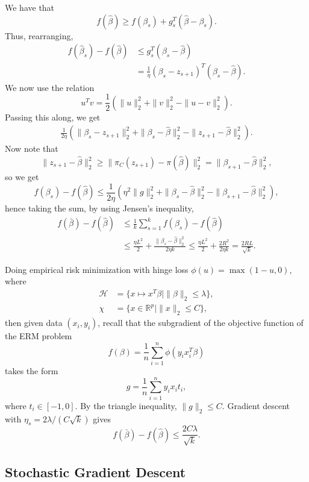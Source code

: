 \documentclass[12pt]{article}
\begin{document}
\begin{proofbox}
	We have that
	\[
	f(\hat \beta) \geq f(\beta_s) + g_s^T(\hat \beta - \beta_s).
	\]
	Thus, rearranging,
	\begin{align*}
		f(\hat \beta_s) - f(\hat \beta) &\leq g_s^T(\beta_s - \hat \beta) \\
						&= \frac{1}{\eta}(\beta_s - z_{s+1})^T(\beta_s - \hat \beta).
	\end{align*}
	We now use the relation
	\[
	u^Tv = \frac{1}{2} (\|u\|_2^2 + \|v\|_2^2 - \|u-v\|_2^2).
	\]
	Passing this along, we get
	\begin{align*}
		\frac{1}{2\eta}(\|\beta_s - z_{s+1}\|_2^2 + \|\beta_s - \hat \beta\|_2^2 - \|z_{s+1} - \hat \beta\|_2^2 ).
	\end{align*}
	Now note that
	\[
	\|z_{s+1} - \hat \beta\|_2^2 \geq \|\pi_C(z_{s+1}) - \pi(\hat \beta)\|_2^2 = \|\beta_{s+1} - \hat \beta\|_2^2,
	\]
	so we get
	\[
	f(\beta_s) - f(\hat \beta) \leq \frac{1}{2 \eta}(\eta^2 \|g\|_2^2 + \|\beta_s - \hat \beta\|_2^2 - \|\beta_{s+1} - \hat \beta\|_2^2),
	\]
	hence taking the sum, by using Jensen's inequality,
	\begin{align*}
		f(\bar \beta) - f(\hat \beta) &\leq \frac{1}{k} \sum_{s = 1}^k f(\beta_s) - f(\hat \beta) \\
					      &\leq \frac{\eta L^2}{2} + \frac{\|\beta_s - \hat \beta\|_2^2}{2 \eta k} \leq \frac{\eta L^2}{2} + \frac{2R^2}{2\eta k} = \frac{2RL}{\sqrt k}.
	\end{align*}
\end{proofbox}

\begin{exbox}
	Doing empirical risk minimization with hinge loss $\phi(u) = \max(1 - u, 0)$, where
	\begin{align*}
		\mathcal{H} &= \{ x \mapsto x^T \beta \mid \|\beta\|_2 \leq \lambda\}, \\
				\chi &= \{x \in \mathbb{R}^p \mid \|x\|_2 \leq C\},
	\end{align*}
	then given data $(x_i, y_i)$, recall that the subgradient of the objective function of the ERM problem
	\[
	f(\beta) = \frac{1}{n} \sum_{i = 1}^n \phi(y_i x_i^T \beta)
	\]
	takes the form
	\[
	g = \frac{1}{n} \sum_{i = 1}^n y_i x_i t_i,
	\]
	where $t_i \in [-1, 0]$. By the triangle inequality, $\|g\|_2 \leq C$. Gradient descent with $\eta_s = 2\lambda/(C\sqrt k)$ gives
	\[
	f(\bar \beta) - f(\hat \beta) \leq \frac{2 C \lambda}{\sqrt k}.
	\]
\end{exbox}

\subsection{Stochastic Gradient Descent}
\label{sub:sgd}
\end{document}
